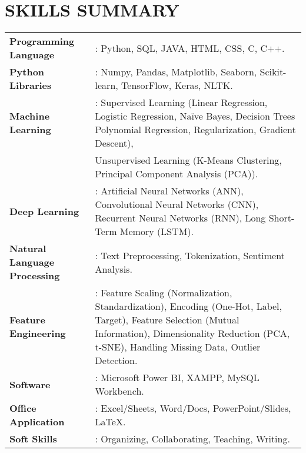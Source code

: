 \documentclass[letterpaper,11pt]{article}
\begin{document}
\section*{\textbf{SKILLS SUMMARY}}
\begin{tabular}{@{}p{} p{}}
    \textbf{Programming Language} & : Python, SQL, JAVA, HTML, CSS, C, C++.\\
    \textbf{Python Libraries} & : Numpy, Pandas, Matplotlib, Seaborn, Scikit-learn, TensorFlow, Keras, NLTK.\\
    \textbf{Machine Learning} & : Supervised Learning (Linear Regression, Logistic Regression, Naïve Bayes, Decision Trees Polynomial Regression, Regularization, Gradient Descent),\\ 
    & Unsupervised Learning (K-Means Clustering, Principal Component Analysis (PCA)).\\
    \textbf{Deep Learning} & : Artificial Neural Networks (ANN), Convolutional Neural Networks (CNN), Recurrent Neural Networks (RNN), Long Short-Term Memory (LSTM).\\
    \textbf{Natural Language Processing} & : Text Preprocessing, Tokenization, Sentiment Analysis.\\
    \textbf{Feature Engineering} & : Feature Scaling (Normalization, Standardization), Encoding (One-Hot, Label, Target), Feature Selection (Mutual Information), Dimensionality Reduction (PCA, t-SNE), Handling Missing Data, Outlier Detection.\\
    \textbf{Software} & : Microsoft Power BI, XAMPP, MySQL Workbench. \\
    \textbf{Office Application} & : Excel/Sheets, Word/Docs, PowerPoint/Slides, LaTeX.\\
    \textbf{Soft Skills} & : Organizing, Collaborating, Teaching, Writing. \\
\end{tabular}
    
\end{document}
